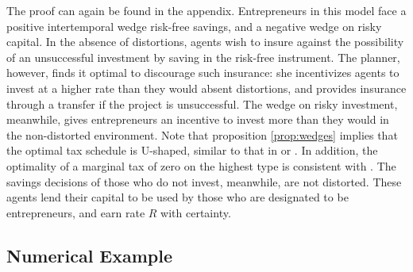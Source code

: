 \documentclass[11pt]{article}
\begin{document}
The proof can again be found in the appendix. Entrepreneurs in this model face a positive intertemporal wedge risk-free savings, and a negative wedge on risky capital. In the absence of distortions, agents wish to insure against the possibility of an unsuccessful investment by saving in the risk-free instrument. The planner, however, finds it optimal to discourage such insurance: she incentivizes agents to invest at a higher rate than they would absent distortions, and provides insurance through a transfer if the project is unsuccessful. The wedge on risky investment, meanwhile, gives entrepreneurs an incentive to invest more than they would in the non-distorted environment. Note that proposition \ref{prop:wedges} implies that the optimal tax schedule is U-shaped, similar to that in \cite{diamond1998optimal} or \cite{saez2001using}. In addition, the optimality of a marginal tax of zero on the highest type is consistent with \cite{mirrlees1971exploration}. The savings decisions of those who do not invest, meanwhile, are not distorted. These agents lend their capital to be used by those who are designated to be entrepreneurs, and earn rate \( R \) with certainty. 

\subsection{Numerical Example}
\end{document}
